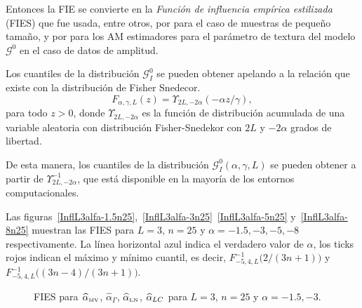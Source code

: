 Entonces la FIE se convierte en la \textit{Función de influencia empírica estilizada} (FIES) que fue usada, entre otros, por \citet{RousseeuwCSDA} para el caso de muestras de pequeño tamaño, y por \citet{AllendeFreryetal:JSCS:05} para los AM estimadores para el parámetro de textura del modelo $\mathcal{G}^0$ en el caso de datos de amplitud.

Los cuantiles de la distribución $\mathcal{G}_I^0$ se pueden obtener apelando a la relación que existe con la distribución de Fisher Snedecor.
\begin{equation}
F_{\alpha,\gamma,L}(z) = \Upsilon_{2L, -2\alpha}(-\alpha  z / \gamma),
\label{eq:CDFG0}
\end{equation}
para todo $z>0$, donde $\Upsilon_{2L, -2\alpha}$ es la función de distribución acumulada de una variable aleatoria con distribución Fisher-Snedekor con $2L$ y $-2\alpha$ grados de libertad.

De esta manera, los cuantiles de la distribución $\mathcal{G}_I^0(\alpha,\gamma,L)$ se pueden obtener a partir de $\Upsilon^{-1}_{2L,-2\alpha}$, que está disponible en la mayoría de los entornos computacionales.

Las figuras~\ref{InflL3alfa-1.5n25},~\ref{InflL3alfa-3n25}~\ref{InflL3alfa-5n25} y~\ref{InflL3alfa-8n25} muestran las FIES para $L=3$, $n=25$ y $\alpha=-1.5, -3, -5, -8$ respectivamente. La línea horizontal azul indica el verdadero valor de $\alpha$, los ticks rojos indican el máximo y mínimo cuantil, es decir, $F^{-1}_{-5,4,L}\big(2/(3n+1)\big)$ y $F^{-1}_{-5,4,L}\big((3n-4)/(3n+1)\big)$. 

\begin{figure}[htb]
	\caption{\label{InflL3n25:-1.5y-3}\small FIES para $\widehat{\alpha}_{\text{\tiny{MV}}}$, $\widehat{\alpha}_{\Gamma}$, $\widehat{\alpha}_{\text{\tiny{LN}}}$, $\widehat{\alpha}_{\text\tiny{{LC}}}$ para $L=3$, $n=25$ y $\alpha=-1.5,-3$.}
\end{figure}

